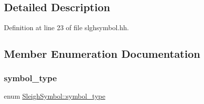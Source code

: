 \subsection{Detailed Description}


Definition at line 23 of file slghsymbol.\+hh.



\subsection{Member Enumeration Documentation}
\mbox{\label{class_sleigh_symbol_aba70f7f332fd63488c5ec4bd7807db41}} 
\subsubsection{\texorpdfstring{symbol\_type}{symbol\_type}}
{\footnotesize\ttfamily enum \mbox{\hyperlink{class_sleigh_symbol_aba70f7f332fd63488c5ec4bd7807db41}{Sleigh\+Symbol\+::symbol\+\_\+type}}}

